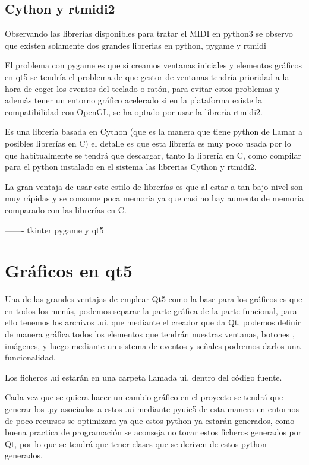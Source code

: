 \documentclass[a4paper,11pt,oneside]{book}
\begin{document}
\subsection{Cython y rtmidi2}
Observando las librerías disponibles para tratar el MIDI en python3 se observo que existen solamente dos grandes librerias en python, pygame y rtmidi

El problema con pygame es que si creamos ventanas iniciales y elementos gráficos en qt5 se tendría el problema de que gestor de ventanas tendría prioridad a la hora de coger los eventos del teclado o ratón, para evitar estos problemas y además tener un entorno gráfico acelerado si en la plataforma existe la compatibilidad con OpenGL, se ha optado por usar la librería rtmidi2.

Es una librería basada en Cython (que es la manera que tiene python de llamar a posibles librerías en C) el detalle es que esta librería es muy poco usada por lo que habitualmente se tendrá que descargar, tanto la librería en C, como compilar para el python instalado en el sistema las librerias Cython y rtmidi2.
 
La gran ventaja de usar este estilo de librerías es que al estar a tan bajo nivel son muy rápidas y se consume poca memoria ya que casi no hay aumento de memoria comparado con las librerías en C.

-------
tkinter pygame y qt5

\section{Gráficos en qt5}
Una de las grandes ventajas de emplear Qt5 como la base para los gráficos es que en todos los menús, podemos separar la parte gráfica de la parte funcional, para ello tenemos los archivos .ui, que mediante el creador que da Qt, podemos definir de manera gráfica todos los elementos que tendrán nuestras ventanas, botones , imágenes, y luego mediante un sistema de eventos y señales podremos darlos una funcionalidad.

Los ficheros .ui estarán en una carpeta llamada ui, dentro del código fuente.

Cada vez que se quiera hacer un cambio gráfico en el proyecto se tendrá que generar los .py asociados a estos .ui mediante pyuic5 de esta manera en entornos de poco recursos se optimizara ya que estos python ya estarán generados, como buena practica de programación se aconseja no tocar estos ficheros generados por Qt, por lo que se tendrá que tener clases que se deriven de estos python generados.
\end{document}
